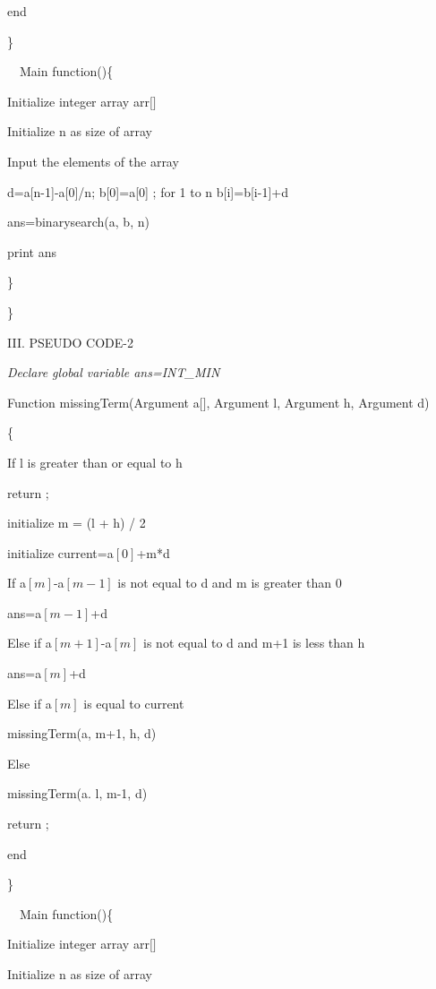 \documentclass[12pt,a4paper]{article}
\begin{document}
\begin{multicols}{2}
end

\} 

\ \ Main function()\{ 

\quad Initialize integer array arr$[$$]$

\quad  Initialize n as size of array

\quad Input the elements of the array 

\quad d=a[n-1]-a[0]/n;
\quad b[0]=a[0] ; 
\quad for 1 to n b[i]=b[i-1]+d

\quad ans=binarysearch(a, b, n)

\quad print ans

\}



\} 


\begin{center}III. PSEUDO CODE-2\end{center}

\textit{ Declare global variable ans=INT\_MIN}

Function missingTerm(Argument a$[$$]$, Argument l, Argument h, Argument d) 


\{ 

\quad  If l is greater than or equal to h 

\quad\quad return ; 



\quad initialize m = (l + h) / 2

\quad initialize current=a$[0]$+m*d



\quad If a$[m]$-a$[m-1]$ is not equal to d and m is greater than 0

\quad\quad ans=a$[m-1]$+d 


\quad Else if a$[m+1]$-a$[m]$ is not equal to d and m+1 is less than h 

 \quad\quad ans=a$[m]$+d 
 
 \quad Else if a$[m]$ is equal to current
 
 \quad\quad missingTerm(a, m+1, h, d)
 
 \quad Else 
 
 \quad\quad missingTerm(a. l, m-1, d)

 

\quad return ; 

end

\} 

\ \ Main function()\{ 

\quad Initialize integer array arr$[$$]$

\quad  Initialize n as size of array


\end{multicols}
\end{document}
